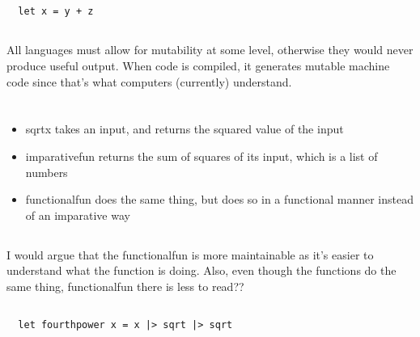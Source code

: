\documentclass[letterpaper]{article}
\begin{document}
\subsection{}
\begin{verbatim}
  let x = y + z
\end{verbatim}

\subsection{}
All languages must allow for mutability at some level, otherwise they would
never produce useful output. When code is compiled, it generates mutable machine
code since that's what computers (currently) understand.
\section{}

\subsection{}
\begin{itemize}
  \item sqrtx takes an input, and returns the squared value of the input
  \item imparativefun returns the sum of squares of its input, which is a list of numbers
  \item functionalfun does the same thing, but does so in a functional manner instead of an imparative way
\end{itemize}

\subsection{}
I would argue that the functionalfun is more maintainable as it's easier to
understand what the function is doing. Also, even though the functions do the
same thing, functionalfun there is less to read?? \todo{}

\subsection{}
\begin{verbatim}
  let fourthpower x = x |> sqrt |> sqrt
\end{verbatim}

\section{}
\inputminted[]{rust}{7.rs}
\end{document}
